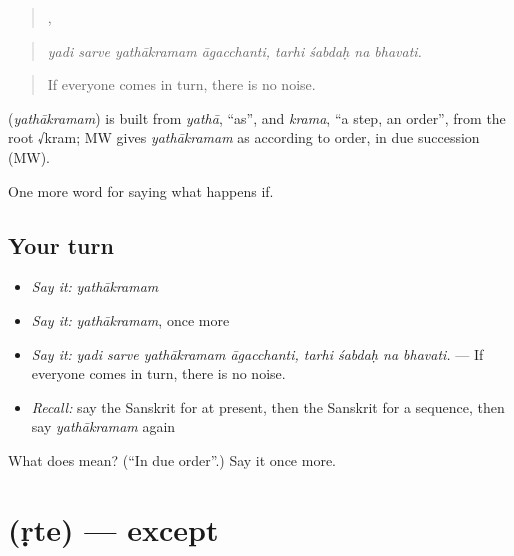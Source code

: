 \begin{quote}
   ,    
\end{quote}

\begin{quote}
\emph{yadi sarve yathākramam āgacchanti, tarhi śabdaḥ na bhavati.}
\end{quote}

\begin{quote}
If everyone comes in turn, there is no noise.
\end{quote}

\begin{cousinweb}
\textbf{} (\emph{yathākramam}) is built from \emph{yathā}, \textquotedblleft{}as\textquotedblright{}, and \emph{krama}, \textquotedblleft{}a step, an order\textquotedblright{}, from the root √kram; MW gives \emph{yathākramam} as according to order, in due succession (MW).
\end{cousinweb}

\begin{grammarlens}[title={What you've built}]
One more word for saying what happens if.
\end{grammarlens}

\subsection*{Your turn}
\begin{itemize}
\raggedright
  \item \emph{Say it:} \emph{yathākramam}
  \item \emph{Say it:} \emph{yathākramam}, once more
  \item \emph{Say it:} \emph{yadi sarve yathākramam āgacchanti, tarhi śabdaḥ na bhavati.} — If everyone comes in turn, there is no noise.
  \item \emph{Recall:} say the Sanskrit for at present, then the Sanskrit for a sequence, then say \emph{yathākramam} again
\end{itemize}

\begin{tcolorbox}[breakable,colback=teal!4,colframe=teal!35!black,title={Before you move on}]
What does  mean? (\textquotedblleft{}In due order\textquotedblright{}.) Say it once more.
\end{tcolorbox}
\section[\texorpdfstring{\sk{ऋते} (ṛte)}{ऋते (ṛte)}]{ (ṛte) — except}

